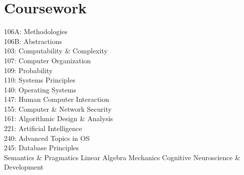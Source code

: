\documentclass[letterpaper]{deedy-resume} %
\begin{document}
\begin{minipage}[t]{0.33\textwidth}
\sectionspace %


\section{Coursework}

%
%


106A: Methodologies \\
106B: Abstractions \\
103: Computability \& Complexity \\
107: Computer Organization \\
109: Probability \\
110: Systems Principles \\
140: Operating Systems \\
147: Human Computer Interaction \\
155: Computer \& Network Security \\
161: Algorithmic Design \& Analysis\\
221: Artificial Intelligence \\
240: Advanced Topics in OS \\
245: Database Principles \\
\vspace{\topsep} %
Semantics \& Pragmatics \textbullet{} Linear Algebra \textbullet{} Mechanics \textbullet{} Cognitive Neuroscience \& Development \\


\sectionspace %


\end{minipage}
\end{document}
